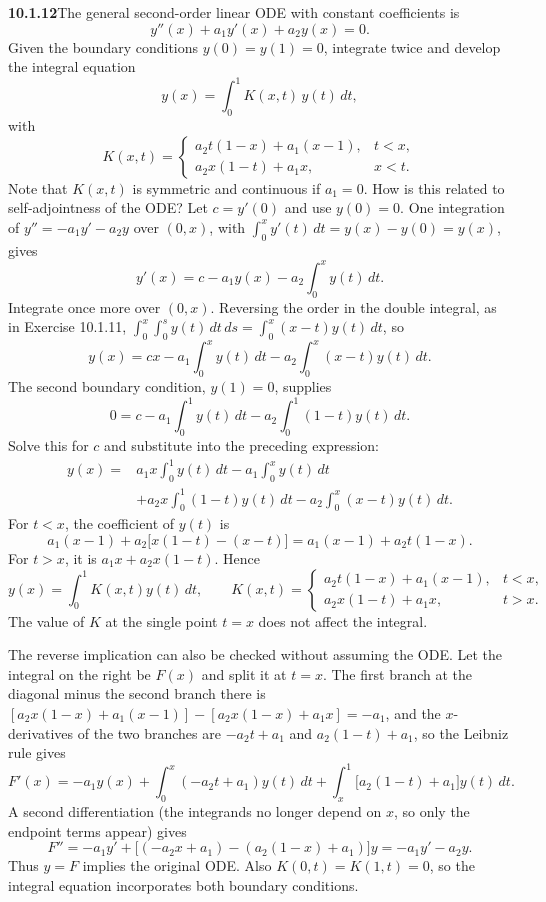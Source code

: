 \par\bigskip
\noindent\textbf{10.1.12}\quad The general second-order linear ODE with
constant coefficients is
\[
y''(x)+a_{1}y'(x)+a_{2}y(x)=0.
\]
Given the boundary conditions $y(0)=y(1)=0$, integrate twice and develop the
integral equation
\[
y(x)=\int_{0}^{1}K(x,t)\,y(t)\,dt,
\]
with
\[
K(x,t)=\begin{cases}
a_{2}t(1-x)+a_{1}(x-1), & t<x,\\
a_{2}x(1-t)+a_{1}x, & x<t.
\end{cases}
\]
Note that $K(x,t)$ is symmetric and continuous if $a_{1}=0$. How is this
related to self-adjointness of the ODE?
\solution
Let $c=y'(0)$ and use $y(0)=0$. One integration of
$y''=-a_1y'-a_2y$ over $(0,x)$, with
$\int_0^xy'(t)\,dt=y(x)-y(0)=y(x)$, gives
\[
y'(x)=c-a_1y(x)-a_2\int_0^xy(t)\,dt.
\]
Integrate once more over $(0,x)$. Reversing the order in the double
integral, as in Exercise 10.1.11,
$\int_0^x\int_0^sy(t)\,dt\,ds=\int_0^x(x-t)y(t)\,dt$, so
\[
y(x)=cx-a_1\int_0^xy(t)\,dt-a_2\int_0^x(x-t)y(t)\,dt.
\]
The second boundary condition, $y(1)=0$, supplies
\[
0=c-a_1\int_0^1y(t)\,dt-a_2\int_0^1(1-t)y(t)\,dt.
\]
Solve this for $c$ and substitute into the preceding expression:
\begin{align*}
y(x)={}&a_1x\int_0^1y(t)\,dt-a_1\int_0^xy(t)\,dt\\
&+a_2x\int_0^1(1-t)y(t)\,dt-a_2\int_0^x(x-t)y(t)\,dt.
\end{align*}
For $t<x$, the coefficient of $y(t)$ is
\[
a_1(x-1)+a_2\bigl[x(1-t)-(x-t)\bigr]
=a_1(x-1)+a_2t(1-x).
\]
For $t>x$, it is $a_1x+a_2x(1-t)$. Hence
\[
\boxed{y(x)=\int_0^1K(x,t)y(t)\,dt,\qquad
K(x,t)=\begin{cases}
a_2t(1-x)+a_1(x-1),&t<x,\\
a_2x(1-t)+a_1x,&t>x.
\end{cases}}
\]
The value of $K$ at the single point $t=x$ does not affect the integral.

The reverse implication can also be checked without assuming the ODE.
Let the integral on the right be $F(x)$ and split it at $t=x$. The
first branch at the diagonal minus the second branch there is
$[a_2x(1-x)+a_1(x-1)]-[a_2x(1-x)+a_1x]=-a_1$, and the $x$-derivatives
of the two branches are $-a_2t+a_1$ and $a_2(1-t)+a_1$, so the
Leibniz rule gives
\[
F'(x)=-a_1y(x)+\int_0^x(-a_2t+a_1)y(t)\,dt
+\int_x^1\bigl[a_2(1-t)+a_1\bigr]y(t)\,dt.
\]
A second differentiation (the integrands no longer depend on $x$, so
only the endpoint terms appear) gives
\[
F''=-a_1y'+\bigl[(-a_2x+a_1)-(a_2(1-x)+a_1)\bigr]y
=-a_1y'-a_2y.
\]
Thus $y=F$ implies the original ODE. Also $K(0,t)=K(1,t)=0$,
so the integral equation incorporates both boundary conditions.

